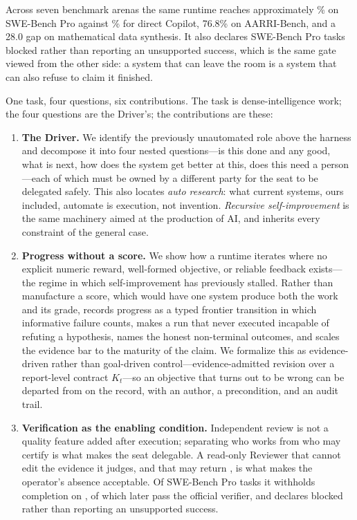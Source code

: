 Across seven benchmark arenas the same runtime reaches approximately
\SWEProArgusAccuracy\% on SWE-Bench Pro against \SWEProDirectAccuracy\% for direct
Copilot, 76.8\% on AARRI-Bench, and a 28.0 gap on mathematical data synthesis. It
also declares \ReviewerFirstBlocked{} SWE-Bench Pro tasks blocked rather than
reporting an unsupported success, which is the same gate viewed from the other side:
a system that can leave the room is a system that can also refuse to claim it
finished.

One task, four questions, six contributions. The task is dense-intelligence work;
the four questions are the Driver's; the contributions are these:

\begin{enumerate}[label=\textbf{C\arabic*.}]
  \item \textbf{The Driver.} We identify the previously unautomated role above the
    harness and decompose it into four nested questions---is this done and any good,
    what is next, how does the system get better at this, does this need a
    person---each of which must be owned by a different party for the seat to be
    delegated safely. This also locates \emph{auto research}: what current systems,
    ours included, automate is execution, not invention. \emph{Recursive
    self-improvement} is the same machinery aimed at the production of AI, and
    inherits every constraint of the general case.

  \item \textbf{Progress without a score.} We show how a runtime iterates where no
    explicit numeric reward, well-formed objective, or reliable feedback exists---the
    regime in which self-improvement has previously stalled. Rather than manufacture
    a score, which would have one system produce both the work and its grade,
    \systemname{} records progress as a typed frontier transition in which
    informative failure counts, makes a run that never executed incapable of refuting
    a hypothesis, names the honest non-terminal outcomes, and scales the evidence bar
    to the maturity of the claim. We formalize this as evidence-driven rather than
    goal-driven control---evidence-admitted revision over a report-level contract
    $K_t$---so an objective that turns out to be wrong can be departed from on the
    record, with an author, a precondition, and an audit trail.

  \item \textbf{Verification as the enabling condition.} Independent review is not a
    quality feature added after execution; separating who works from who may certify
    is what makes the seat delegable. A
    read-only Reviewer that cannot edit the evidence it judges, and that may return
    , is what makes the operator's absence acceptable. Of
    \ReviewerTasks{} SWE-Bench Pro tasks it withholds completion on
    \ReviewerRevisionRequested{}, \ReviewerVerifierRecovered{} of which later pass the
    official verifier, and declares \ReviewerFirstBlocked{} blocked rather than
    reporting an unsupported success.


\end{enumerate}
